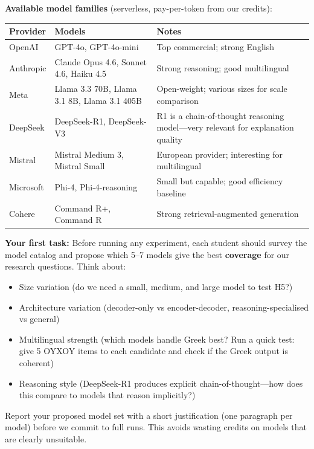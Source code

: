 \documentclass[11pt,a4paper]{article}
\begin{document}
\textbf{Available model families} (serverless, pay-per-token from our credits):

\begin{table}[h!]
\centering\small
\begin{tabularx}{\textwidth}{l l X}
\toprule
\textbf{Provider} & \textbf{Models} & \textbf{Notes} \\
\midrule
OpenAI & GPT-4o, GPT-4o-mini & Top commercial; strong English \\
Anthropic & Claude Opus 4.6, Sonnet 4.6, Haiku 4.5 & Strong reasoning; good multilingual \\
Meta & Llama 3.3 70B, Llama 3.1 8B, Llama 3.1 405B & Open-weight; various sizes for scale comparison \\
DeepSeek & DeepSeek-R1, DeepSeek-V3 & R1 is a chain-of-thought reasoning model---very relevant for explanation quality \\
Mistral & Mistral Medium 3, Mistral Small & European provider; interesting for multilingual \\
Microsoft & Phi-4, Phi-4-reasoning & Small but capable; good efficiency baseline \\
Cohere & Command R+, Command R & Strong retrieval-augmented generation \\
\bottomrule
\end{tabularx}
\end{table}

\textbf{Your first task:} Before running any experiment, each student should survey the model catalog and propose which 5--7 models give the best \textbf{coverage} for our research questions. Think about:

\begin{itemize}[nosep,leftmargin=1.5em]
\item Size variation (do we need a small, medium, and large model to test H5?)
\item Architecture variation (decoder-only vs encoder-decoder, reasoning-specialised vs general)
\item Multilingual strength (which models handle Greek best? Run a quick test: give 5 OYXOY items to each candidate and check if the Greek output is coherent)
\item Reasoning style (DeepSeek-R1 produces explicit chain-of-thought---how does this compare to models that reason implicitly?)
\end{itemize}

Report your proposed model set with a short justification (one paragraph per model) before we commit to full runs. This avoids wasting credits on models that are clearly unsuitable.
\end{document}
